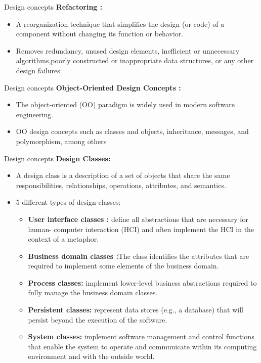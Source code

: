 \documentclass{beamer}
\begin{document}
\begin{frame}{Design concepts}
	\textbf{Refactoring :}
	\begin{itemize}
		\item A reorganization technique that simplifies the design (or code) of a  component without changing its function or behavior.
		\item Removes redundancy, unused design elements, inefficient or unnecessary algorithms,poorly constructed or inappropriate data structures, or any other design failures
	\end{itemize}
\end{frame}
\begin{frame}{Design concepts}
	\textbf{Object-Oriented Design Concepts :}
	\begin{itemize}
		\item The object-oriented (OO) paradigm is widely used in modern software 
		engineering. 
		\item OO design concepts such as classes and objects, inheritance, 
		messages, and polymorphism, among others
	\end{itemize}
\end{frame}
\begin{frame}{Design concepts}
	\textbf{Design Classes:}
	\begin{itemize}
		\item A design class is a description of a set of objects that share the same responsibilities, relationships, operations, attributes, and semantics.
		\item 5 different types of design classes:
		\begin{itemize}
			\item  \textbf{User interface classes :} define all abstractions that are necessary for human-
			computer interaction (HCI) and often implement the HCI in the context of a metaphor.
		\item \textbf{Business domain classes :}The class identifies the attributes that are required to implement some elements of the business domain.
			\item \textbf{Process classes:} implement lower-level business abstractions required to fully
			manage the business domain classes.
			\item \textbf{Persistent classes:} represent data stores (e.g., a database) that will persist beyond  the execution of the software.
		\item \textbf{	System classes:} implement software management and control functions that enable  the system to operate and communicate within its computing environment and with  the outside world.
			
		\end{itemize}
	\end{itemize}
\end{frame}
\end{document}
